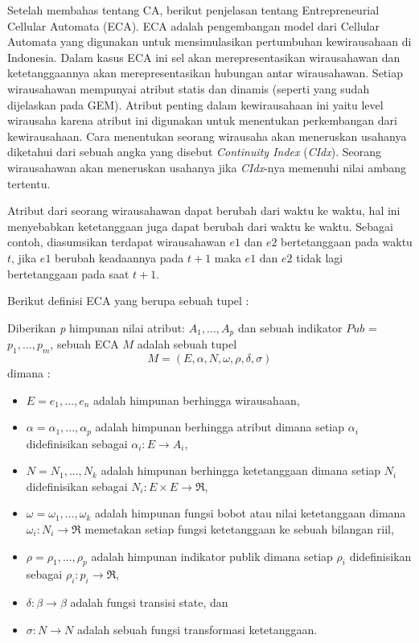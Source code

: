 \documentclass[a4paper,twoside]{article}
\begin{document}
\begin{enumerate}
\begin{enumerate}
			
		Setelah membahas tentang CA, berikut penjelasan tentang Entrepreneurial Cellular Automata (ECA). ECA adalah pengembangan model dari Cellular Automata yang digunakan untuk mensimulasikan pertumbuhan kewirausahaan di Indonesia. Dalam kasus ECA ini sel akan merepresentasikan wirausahawan dan ketetanggaannya akan merepresentasikan hubungan antar wirausahawan. Setiap wirausahawan mempunyai atribut statis dan dinamis (seperti yang sudah dijelaskan pada GEM). Atribut penting dalam kewirausahaan ini yaitu level wirausaha karena atribut ini digunakan untuk menentukan perkembangan dari kewirausahaan. Cara menentukan seorang wirausaha akan meneruskan usahanya diketahui dari sebuah angka yang disebut \textit{Continuity Index} (\textit{CIdx}). Seorang wirausahawan akan meneruskan usahanya jika \textit{CIdx}-nya memenuhi nilai ambang tertentu.
		
		Atribut dari seorang wirausahawan dapat berubah dari waktu ke waktu, hal ini menyebabkan ketetanggaan juga dapat berubah dari waktu ke waktu. Sebagai contoh, diasumsikan terdapat wirausahawan $e1$ dan $e2$ bertetanggaan pada waktu $t$, jika $e1$ berubah keadaannya pada $t+1$ maka $e1$ dan $e2$ tidak lagi bertetanggaan pada saat $t+1$.
		
		
		Berikut definisi ECA yang berupa sebuah tupel :
		
		Diberikan \textit{p} himpunan nilai atribut: $A_{1}, ..., A_{p}$ dan sebuah indikator $Pub$ = ${p_{1}, ..., p_{m}}$, sebuah ECA $M$ adalah sebuah tupel
\begin{displaymath}
	M = (E, \alpha, N, \omega, \rho, \delta, \sigma)
\end{displaymath}
dimana :
\begin{itemize}
	\item $E = {e_{1}, ..., e_{n}}$ adalah himpunan berhingga wirausahaan,
	\item $\alpha = {\alpha_{1}, ..., \alpha_{p}}$ adalah himpunan berhingga atribut dimana setiap $\alpha_{i}$ didefinisikan sebagai $\alpha_{i} : E \rightarrow A_{i}$,
	\item $N = {N_{1}, ..., N_{k}}$ adalah himpunan berhingga ketetanggaan dimana setiap $N_{i}$ didefinisikan sebagai $N_{i}:E \times E \rightarrow \Re$,
	\item $\omega = {\omega_{1}, ..., \omega_{k}}$ adalah himpunan fungsi bobot atau nilai ketetanggaan dimana $\omega_{i} : N_{i} \rightarrow \Re$ memetakan setiap fungsi ketetanggaan ke sebuah bilangan riil,
	\item $\rho = {\rho_{1}, ..., \rho_{p}}$ adalah himpunan indikator publik dimana setiap $\rho_{i}$ didefinisikan sebagai $\rho_{i} : p_{i} \rightarrow \Re$,
	\item $\delta : \beta \rightarrow \beta$ adalah fungsi transisi state, dan
	\item $\sigma : N \rightarrow N$ adalah sebuah fungsi transformasi ketetanggaan.
\end{itemize}


\end{enumerate}
\end{enumerate}
\end{document}
